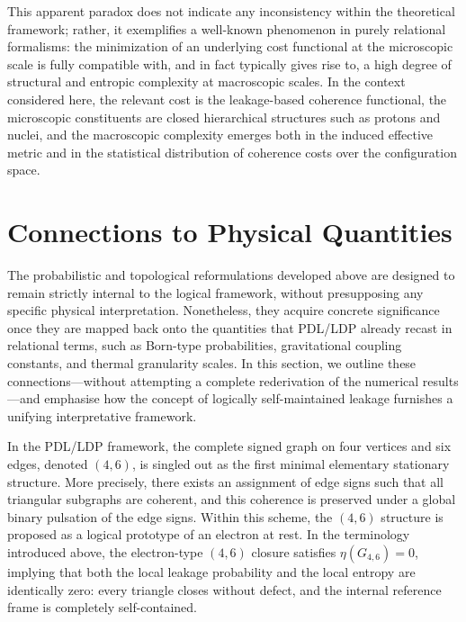 \documentclass[11pt,a4paper]{article}
\theoremstyle{definition}
\begin{document}
This apparent paradox does not indicate any inconsistency within the theoretical framework; rather, it exemplifies a well-known phenomenon in purely relational formalisms: the minimization of an underlying cost functional at the microscopic scale is fully compatible with, and in fact typically gives rise to, a high degree of structural and entropic complexity at macroscopic scales. In the context considered here, the relevant cost is the leakage-based coherence functional, the microscopic constituents are closed hierarchical structures such as protons and nuclei, and the macroscopic complexity emerges both in the induced effective metric and in the statistical distribution of coherence costs over the configuration space.

\section{Connections to Physical Quantities}

The probabilistic and topological reformulations developed above are designed to remain strictly internal to the logical framework, without presupposing any specific physical interpretation. Nonetheless, they acquire concrete significance once they are mapped back onto the quantities that PDL/LDP already recast in relational terms, such as Born-type probabilities, gravitational coupling constants, and thermal granularity scales. In this section, we outline these connections—without attempting a complete rederivation of the numerical results—and emphasise how the concept of logically self-maintained leakage furnishes a unifying interpretative framework.

In the PDL/LDP framework, the complete signed graph on four vertices and six edges, denoted \((4,6)\), is singled out as the first minimal elementary stationary structure. More precisely, there exists an assignment of edge signs such that all triangular subgraphs are coherent, and this coherence is preserved under a global binary pulsation of the edge signs. Within this scheme, the \((4,6)\) structure is proposed as a logical prototype of an electron at rest. In the terminology introduced above, the electron-type \((4,6)\) closure satisfies \(\eta(G_{4,6}) = 0\), implying that both the local leakage probability and the local entropy are identically zero: every triangle closes without defect, and the internal reference frame is completely self-contained.
\end{document}
